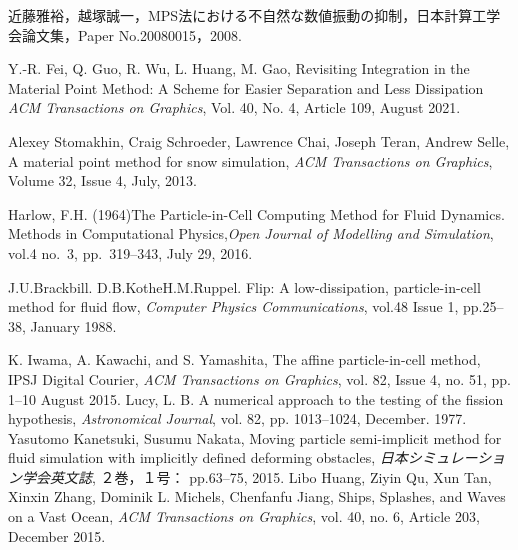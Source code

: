 \documentclass[a4j,12pt]{jreport}
\begin{document}
\begin{thebibliography}{99}

近藤雅裕，越塚誠一，MPS法における不自然な数値振動の抑制，日本計算工学会論文集，Paper No.20080015，2008. 

Y.-R. Fei, Q. Guo, R. Wu, L. Huang, M. Gao, Revisiting Integration in the Material Point Method: A Scheme for Easier Separation and Less Dissipation \textit{ACM Transactions on Graphics}, Vol. 40, No. 4, Article 109, August 2021.

Alexey Stomakhin, Craig Schroeder, Lawrence Chai, Joseph Teran, Andrew Selle, A material point method for snow simulation, \textit{ACM Transactions on Graphics},  Volume 32, Issue 4, July, 2013.

Harlow, F.H. (1964)The Particle-in-Cell Computing Method for Fluid Dynamics. Methods in Computational Physics,\textit{Open Journal of Modelling and Simulation},  vol.4 no.~3, pp.~319--343, July 29, 2016.

J.U.Brackbill. D.B.KotheH.M.Ruppel. Flip: A low-dissipation, particle-in-cell method for fluid flow, \textit{Computer Physics Communications}, vol.48 Issue 1, pp.25--38, January 1988.

K. Iwama, A. Kawachi, and S. Yamashita, The affine particle-in-cell method, IPSJ Digital Courier, \textit{ACM Transactions on Graphics}, vol. 82, Issue 4, no. 51, pp. 1--10 August 2015.
Lucy, L. B. A numerical approach to the testing of the fission hypothesis, \textit{Astronomical Journal}, vol. 82, pp. 1013--1024, December. 1977.
Yasutomo Kanetsuki, Susumu Nakata, Moving particle semi-implicit method for fluid simulation with implicitly defined deforming obstacles, \textit{日本シミュレーション学会英文誌}, ２巻，１号： pp.63--75, 2015.
Libo Huang, Ziyin Qu, Xun Tan, Xinxin Zhang, Dominik L. Michels, Chenfanfu Jiang, Ships, Splashes, and Waves on a Vast Ocean, \textit{ACM Transactions on Graphics}, vol. 40, no. 6, Article 203, December 2015. 

\end{thebibliography}

\end{document}
